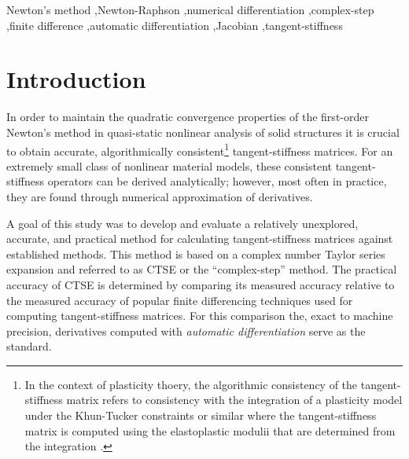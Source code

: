 \documentclass[preprint,12pt]{elsarticle}
\begin{document}
\begin{frontmatter}
\begin{abstract}
\end{abstract}

\begin{keyword}
Newton's method \sep Newton-Raphson \sep numerical differentiation \sep complex-step \sep finite difference \sep automatic differentiation \sep Jacobian \sep tangent-stiffness
\end{keyword}

\end{frontmatter}



\section{Introduction}
\label{sec:intro} 

In order to maintain the quadratic convergence properties of the first-order Newton's method \cite{belytschko1999nonlinear} \cite[Ch.~13]{young2009} in quasi-static nonlinear analysis of solid structures it is crucial to obtain accurate, algorithmically consistent\footnote{In the context of plasticity thoery, the algorithmic consistency of the tangent-stiffness matrix refers to consistency with the integration of a plasticity model under the Khun-Tucker constraints or similar where the tangent-stiffness matrix is computed using the elastoplastic modulii that are determined from the integration \cite{simo1998}.} tangent-stiffness matrices. For an extremely small class of nonlinear material models, these consistent tangent-stiffness operators can be derived analytically; however, most often in practice, they are found through numerical approximation of derivatives. 

A goal of this study was to develop and evaluate a  relatively unexplored, accurate, and practical method for calculating tangent-stiffness matrices against established methods.  This   method is based on a complex number Taylor series expansion and referred to as CTSE or the ``complex-step'' method. The practical accuracy of CTSE is determined by comparing its measured accuracy relative to the measured accuracy of popular finite differencing techniques used for computing tangent-stiffness matrices. For this comparison the,  exact to machine precision, derivatives computed with \emph{automatic differentiation} serve as the standard.
\end{document}
